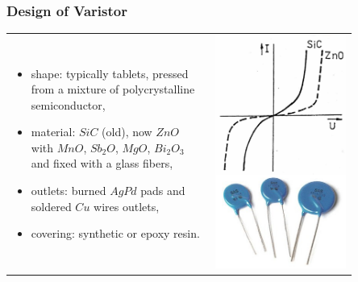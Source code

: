 \documentclass{beamer}
\begin{document}
	\begin{frame}
    \frametitle{Design of Varistor}
			\begin{center}
			\begin{tabular}{m{0.5\linewidth} m{0.35\linewidth}}
			\small
			\begin{itemize}
				\item shape: typically tablets, pressed from a mixture of polycrystalline semiconductor,
				\item material: $SiC$ (old), now $ZnO$ with $MnO$, $Sb_2O$, $MgO$, $Bi_2O_3$ and fixed with a glass fibers,
				\item outlets: burned $AgPd$ pads and soldered $Cu$ wires outlets,
				\item covering: synthetic or epoxy resin.
			\end{itemize} & \includegraphics[scale=0.4]{obr15_varPouzdra.png}
		\end{tabular}
		\end{center}
  \end{frame}
\end{document}
